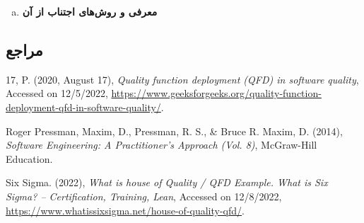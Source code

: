 {\begin{enumerate}[a)]
\item

\textbf{معرفی  و روش‌های اجتناب از آن}

\end{enumerate}

\subsection*{مراجع}

\begin{latin}
	\begingroup
	\renewcommand{\section}[2]{}%
	
\begin{thebibliography}{9}
	

	17, P. (2020, August 17),
	\textit{Quality function deployment (QFD) in software quality},
	Accessed on 12/5/2022, 
	\url{https://www.geeksforgeeks.org/quality-function-deployment-qfd-in-software-quality/}.

	Roger Pressman, Maxim, D., Pressman, R. S., \& Bruce R. Maxim, D. (2014),
	\textit{Software Engineering: A Practitioner’s Approach (Vol. 8)},
	McGraw-Hill Education.

	Six Sigma. (2022),
	\textit{What is house of Quality / QFD Example. What is Six Sigma? – Certification, Training, Lean},
	Accessed on 12/8/2022, 
	\url{https://www.whatissixsigma.net/house-of-quality-qfd/}.

\end{thebibliography}
\endgroup
\end{latin}

}
\newpage
